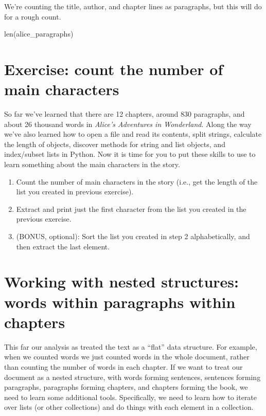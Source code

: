 \documentclass[]{book}
\newenvironment{Shaded}{\begin{snugshade}}{\end{snugshade}}
\newcommand{\BuiltInTok}[1]{#1}
\newcommand{\NormalTok}[1]{#1}
\begin{document}
We're counting the title, author, and chapter lines as paragraphs, but
this will do for a rough count.

\begin{Shaded}
\begin{Highlighting}[]
\BuiltInTok{len}\NormalTok{(alice_paragraphs)}
\end{Highlighting}
\end{Shaded}

\section{Exercise: count the number of main
characters}\label{exercise-count-the-number-of-main-characters}

So far we've learned that there are 12 chapters, around 830 paragraphs,
and about 26 thousand words in \emph{Alice's Adventures in Wonderland}.
Along the way we've also learned how to open a file and read its
contents, split strings, calculate the length of objects, discover
methods for string and list objects, and index/subset lists in Python.
Now it is time for you to put these skills to use to learn something
about the main characters in the story.

\begin{enumerate}
\def\labelenumi{\arabic{enumi}.}
\item
  Count the number of main characters in the story (i.e., get the length
  of the list you created in previous exercise).
\item
  Extract and print just the first character from the list you created
  in the previous exercise.
\item
  (BONUS, optional): Sort the list you created in step 2 alphabetically,
  and then extract the last element.
\end{enumerate}

\section{Working with nested structures: words within paragraphs within
chapters}\label{working-with-nested-structures-words-within-paragraphs-within-chapters}

This far our analysis as treated the text as a ``flat'' data structure.
For example, when we counted words we just counted words in the whole
document, rather than counting the number of words in each chapter. If
we want to treat our document as a nested structure, with words forming
sentences, sentences forming paragraphs, paragraphs forming chapters,
and chapters forming the book, we need to learn some additional tools.
Specifically, we need to learn how to iterate over lists (or other
collections) and do things with each element in a collection.
\end{document}
